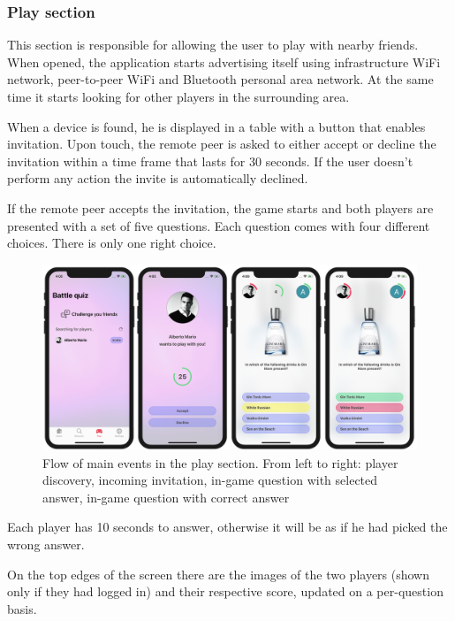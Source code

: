 \documentclass[paper=a4, fontsize=12pt]{scrartcl}
\numberwithin{equation}{section}		%
\numberwithin{figure}{section}			%
\numberwithin{table}{section}				%
\begin{document}
\subsubsection{Play section}

This section is responsible for allowing the user to play with nearby friends.
When opened, the application starts advertising itself using infrastructure WiFi network, peer-to-peer WiFi and Bluetooth personal area network. At the same time it starts looking for other players in the surrounding area. 

When a device is found, he is displayed in a table with a button that enables invitation. Upon touch, the remote peer is asked to either accept or decline the invitation within a time frame that lasts for 30 seconds. If the user doesn't perform any action the invite is automatically declined.

If the remote peer accepts the invitation, the game starts and both players are presented with a set of five questions. Each question comes with four different choices. There is only one right choice. 

\begin{figure}[!ht]
\begin{center}
    \includegraphics[width=\textwidth]{UI/UI-Play.png}
    \caption{Flow of main events in the play section. From left to right: player discovery, incoming invitation, in-game question with selected answer, in-game question with correct answer}
    \label{Play}
\end{center}
\end{figure}


Each player has 10 seconds to answer, otherwise it will be as if he had picked the wrong answer. 

On the top edges of the screen there are the images of the two players (shown only if they had logged in) and their respective score, updated on a per-question basis.
\end{document}
